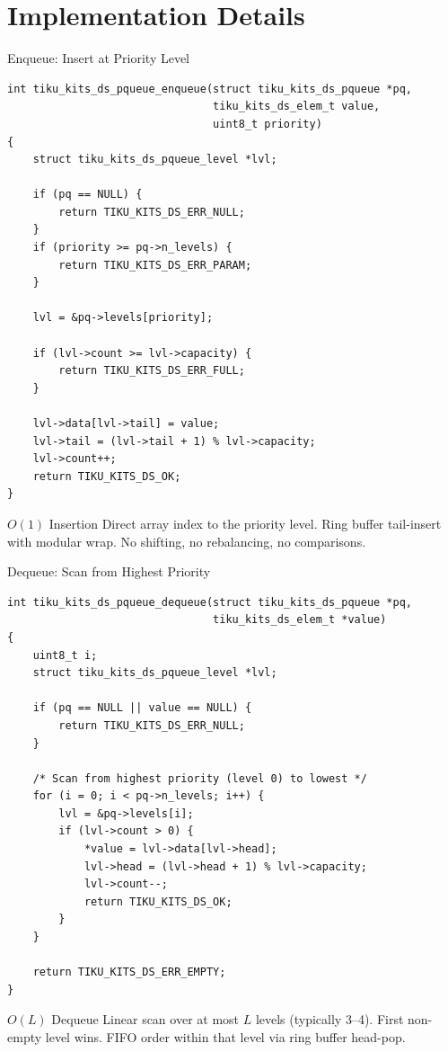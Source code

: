 \documentclass[aspectratio=169, 10pt]{beamer}
\begin{document}
\section{Implementation Details}

\begin{frame}[fragile]{Enqueue: Insert at Priority Level}
\begin{lstlisting}[style=cstyle,
  title={tiku\_kits\_ds\_pqueue.c --- enqueue}]
int tiku_kits_ds_pqueue_enqueue(struct tiku_kits_ds_pqueue *pq,
                                tiku_kits_ds_elem_t value,
                                uint8_t priority)
{
    struct tiku_kits_ds_pqueue_level *lvl;

    if (pq == NULL) {
        return TIKU_KITS_DS_ERR_NULL;
    }
    if (priority >= pq->n_levels) {
        return TIKU_KITS_DS_ERR_PARAM;
    }

    lvl = &pq->levels[priority];

    if (lvl->count >= lvl->capacity) {
        return TIKU_KITS_DS_ERR_FULL;
    }

    lvl->data[lvl->tail] = value;
    lvl->tail = (lvl->tail + 1) % lvl->capacity;
    lvl->count++;
    return TIKU_KITS_DS_OK;
}
\end{lstlisting}

\begin{block}{$O(1)$ Insertion}
Direct array index to the priority level. Ring buffer tail-insert with modular wrap.
No shifting, no rebalancing, no comparisons.
\end{block}
\end{frame}

\begin{frame}[fragile]{Dequeue: Scan from Highest Priority}
\begin{lstlisting}[style=cstyle,
  title={tiku\_kits\_ds\_pqueue.c --- dequeue}]
int tiku_kits_ds_pqueue_dequeue(struct tiku_kits_ds_pqueue *pq,
                                tiku_kits_ds_elem_t *value)
{
    uint8_t i;
    struct tiku_kits_ds_pqueue_level *lvl;

    if (pq == NULL || value == NULL) {
        return TIKU_KITS_DS_ERR_NULL;
    }

    /* Scan from highest priority (level 0) to lowest */
    for (i = 0; i < pq->n_levels; i++) {
        lvl = &pq->levels[i];
        if (lvl->count > 0) {
            *value = lvl->data[lvl->head];
            lvl->head = (lvl->head + 1) % lvl->capacity;
            lvl->count--;
            return TIKU_KITS_DS_OK;
        }
    }

    return TIKU_KITS_DS_ERR_EMPTY;
}
\end{lstlisting}

\begin{block}{$O(L)$ Dequeue}
Linear scan over at most $L$ levels (typically 3--4). First non-empty level
wins. FIFO order within that level via ring buffer head-pop.
\end{block}
\end{frame}
\end{document}

